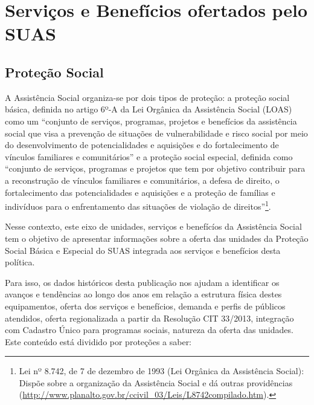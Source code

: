 \documentclass[
  letterpaper,
  DIV=11,
  numbers=noendperiod]{scrreprt}
\begin{document}

\chapter{Serviços e Benefícios ofertados pelo
SUAS}\label{serviuxe7os-e-benefuxedcios-ofertados-pelo-suas}

\section{Proteção Social}\label{proteuxe7uxe3o-social}

A Assistência Social organiza-se por dois tipos de proteção: a proteção
social básica, definida no artigo 6º-A da Lei Orgânica da Assistência
Social (LOAS) como um ``conjunto de serviços, programas, projetos e
benefícios da assistência social que visa a prevenção de situações de
vulnerabilidade e risco social por meio do desenvolvimento de
potencialidades e aquisições e do fortalecimento de vínculos familiares
e comunitários'' e a proteção social especial, definida como ``conjunto
de serviços, programas e projetos que tem por objetivo contribuir para a
reconstrução de vínculos familiares e comunitários, a defesa de direito,
o fortalecimento das potencialidades e aquisições e a proteção de
famílias e indivíduos para o enfrentamento das situações de violação de
direitos''\footnote{Lei nº 8.742, de 7 de dezembro de 1993 (Lei Orgânica
  da Assistência Social): Dispõe sobre a organização da Assistência
  Social e dá outras providências
  (\url{http://www.planalto.gov.br/ccivil_03/Leis/L8742compilado.htm}).}.

Nesse contexto, este eixo de unidades, serviços e benefícíos da
Assistência Social tem o objetivo de apresentar informações sobre a
oferta das unidades da Proteção Social Básica e Especial do SUAS
integrada aos serviços e benefícios desta política.

Para isso, os dados históricos desta publicação nos ajudam a identificar
os avanços e tendências ao longo dos anos em relação a estrutura física
destes equipamentos, oferta dos serviços e benefícios, demanda e perfis
de públicos atendidos, oferta regionalizada a partir da Resolução CIT
33/2013, integração com Cadastro Único para programas sociais, natureza
da oferta das unidades. Este conteúdo está dividido por proteções a
saber:
\end{document}
